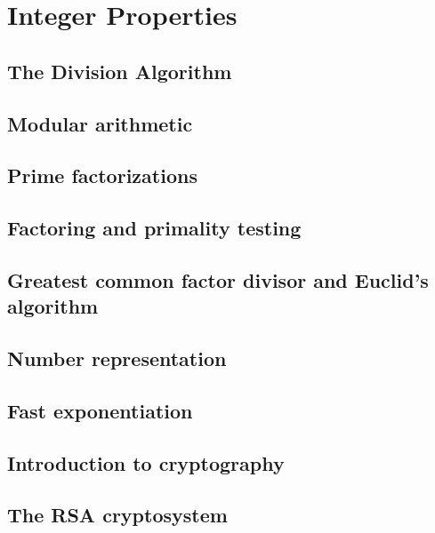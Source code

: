 \section{Integer Properties}
\subsection{The Division Algorithm}
\subsection{Modular arithmetic}
\subsection{Prime factorizations}
\subsection{Factoring and primality testing}
\subsection{Greatest common factor divisor and Euclid's algorithm}
\subsection{Number representation}
\subsection{Fast exponentiation}
\subsection{Introduction to cryptography}
\subsection{The RSA cryptosystem}
